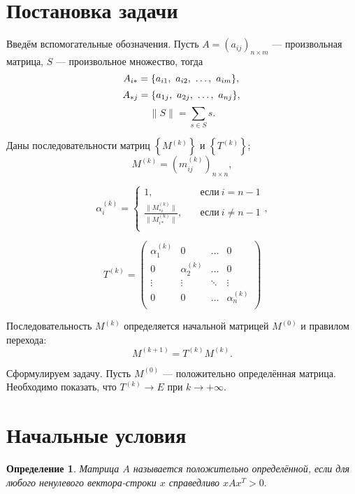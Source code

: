 \documentclass{article}
\newtheorem{define}{Определение}
\newcommand{\Abs}[1]{\lVert{}#1{}\rVert}
\newcommand{\ak}[1][k]{\alpha^{(#1)}}
\newcommand{\mk}[1][k]{m^{(#1)}}
\newcommand{\Mk}[1][k]{M^{(#1)}}
\newcommand{\Tk}[1][k]{T^{(#1)}}
\begin{document}
\section{Постановка задачи}

Введём вспомогательные обозначения. Пусть $A = \left( a_{ij} \right)_{n \times m}$ — произвольная матрица, $S$ —
 произвольное множество, тогда
\[
  A_{i*} = \{ a_{i1},\ a_{i2},\ \ldots,\ a_{im} \} , \\
\]
\[
  A_{*j} = \{ a_{1j},\ a_{2j},\ \ldots,\ a_{nj} \} , \\
\]
\[
  \Abs{S} = \sum_{s \in S}{s}.
\]

Даны последовательности матриц $\left\{ \Mk \right\}$ и $\left\{ \Tk \right\}$;
\[ \Mk = \left( \mk_{ij} \right)_{n\times{}n}, \]

\begin{displaymath}
  \ak_{i} = \left\{
  \begin{array}{cl}
    1, & \quad \text{если} \ i = n - 1 \\
    \frac{\Abs{\Mk_{*i}}}{\Abs{\Mk_{i*}}}, & \quad \text{если} \ i \not= n - 1 \\
  \end{array}
  \right. ,
\end{displaymath}

\begin{displaymath}
  \Tk = \left(
  \begin{array}{cccc}
     \ak_1 &      0 & \ldots &      0 \\
         0 &  \ak_2 & \ldots &      0 \\
    \vdots & \vdots & \ddots & \vdots \\
         0 &      0 & \ldots &  \ak_n \\
  \end{array}
  \right)
\end{displaymath}

Последовательность $\Mk$ определяется начальной матрицей $\Mk[0]$ и правилом перехода:
\[ \Mk[k + 1] = \Tk \Mk. \]

Сформулируем задачу. Пусть $\Mk[0]$ — положительно определённая матрица. Необходимо показать, что $\Tk \rightarrow E$ при $k \rightarrow +\infty$.


\section{Начальные условия}

\begin{define}
Матрица $A$ {\it называется положительно определённой,} если для любого ненулевого вектора-строки $x$ справедливо $x A x^T > 0.$
\end{define}
\end{document}
